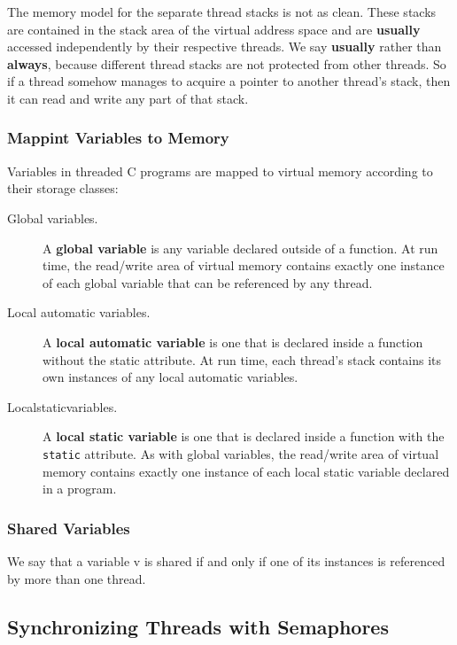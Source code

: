 \documentclass[11pt]{article}
\begin{document}
The memory model for the separate thread stacks is not as clean. These stacks are contained in the stack area of the virtual address space and are \textbf{usually} accessed independently by their respective threads. We say \textbf{usually} rather than \textbf{always}, because different thread stacks are not protected from other threads. So if a thread somehow manages to acquire a pointer to another thread’s stack, then it can read and write any part of that stack.\\


\subsubsection{Mappint Variables to Memory}
\label{sec:org2c893b4}
Variables in threaded C programs are mapped to virtual memory according to their storage classes:\\
\begin{description}
\item[{Global variables.}] A \textbf{global variable} is any variable declared outside of a function. At run time, the read/write area of virtual memory contains exactly one instance of each global variable that can be referenced by any thread.\\
\item[{Local automatic variables.}] A \textbf{local automatic variable} is one that is declared inside a function without the static attribute. At run time, each thread’s stack contains its own instances of any local automatic variables.\\
\item[{Localstaticvariables.}] A \textbf{local static variable} is one that is declared inside a function with the \texttt{static} attribute. As with global variables, the read/write area of virtual memory contains exactly one instance of each local static variable declared in a program.\\
\end{description}


\subsubsection{Shared Variables}
\label{sec:org9b5bcbc}
We say that a variable v is shared if and only if one of its instances is referenced by more than one thread.\\


\subsection{Synchronizing Threads with Semaphores}
\label{sec:orgd39d6f4}
\end{document}
